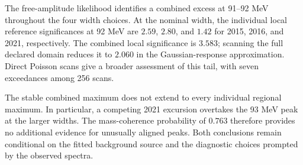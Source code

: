 The free-amplitude likelihood identifies a combined excess at 91--92 MeV
throughout the four width choices. At the nominal width, the individual
local reference significances at 92 MeV are $2.59$, $2.80$, and $1.42$ for
2015, 2016, and 2021, respectively. The combined local significance is
$3.583$; scanning the full declared domain reduces it to $2.060$ in the
Gaussian-response approximation. Direct Poisson scans give a broader
assessment of this tail, with seven exceedances among 256 scans.

The stable combined maximum does not extend to every individual regional
maximum. In particular, a competing 2021 excursion overtakes the 93 MeV
peak at the larger widths. The mass-coherence probability of $0.763$
therefore provides no additional evidence for unusually aligned peaks.
Both conclusions remain conditional on the fitted background source and
the diagnostic choices prompted by the observed spectra.
